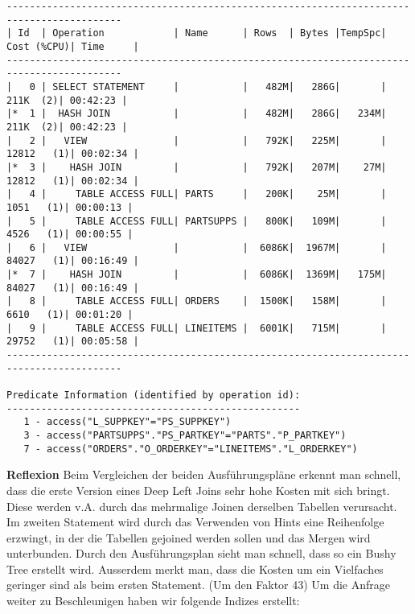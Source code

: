 \documentclass[10pt]{article}
\begin{document}
\begin{lstlisting}[style=queryexecutionplan]
------------------------------------------------------------------------------------------
| Id  | Operation            | Name      | Rows  | Bytes |TempSpc| Cost (%CPU)| Time     |
------------------------------------------------------------------------------------------
|   0 | SELECT STATEMENT     |           |   482M|   286G|       |   211K  (2)| 00:42:23 |
|*  1 |  HASH JOIN           |           |   482M|   286G|   234M|   211K  (2)| 00:42:23 |
|   2 |   VIEW               |           |   792K|   225M|       | 12812   (1)| 00:02:34 |
|*  3 |    HASH JOIN         |           |   792K|   207M|    27M| 12812   (1)| 00:02:34 |
|   4 |     TABLE ACCESS FULL| PARTS     |   200K|    25M|       |  1051   (1)| 00:00:13 |
|   5 |     TABLE ACCESS FULL| PARTSUPPS |   800K|   109M|       |  4526   (1)| 00:00:55 |
|   6 |   VIEW               |           |  6086K|  1967M|       | 84027   (1)| 00:16:49 |
|*  7 |    HASH JOIN         |           |  6086K|  1369M|   175M| 84027   (1)| 00:16:49 |
|   8 |     TABLE ACCESS FULL| ORDERS    |  1500K|   158M|       |  6610   (1)| 00:01:20 |
|   9 |     TABLE ACCESS FULL| LINEITEMS |  6001K|   715M|       | 29752   (1)| 00:05:58 |
------------------------------------------------------------------------------------------

Predicate Information (identified by operation id):
---------------------------------------------------
   1 - access("L_SUPPKEY"="PS_SUPPKEY")
   3 - access("PARTSUPPS"."PS_PARTKEY"="PARTS"."P_PARTKEY")
   7 - access("ORDERS"."O_ORDERKEY"="LINEITEMS"."L_ORDERKEY")
\end{lstlisting}
\textbf{Reflexion} \newline
Beim Vergleichen der beiden Ausführungspläne erkennt man schnell, dass die erste Version eines Deep Left Joins sehr hohe Kosten mit sich bringt. Diese werden v.A. durch das mehrmalige Joinen derselben Tabellen verursacht.\newline
Im zweiten Statement wird durch das Verwenden von Hints eine Reihenfolge erzwingt, in der die Tabellen gejoined werden sollen und das Mergen wird unterbunden.\newline
Durch den Ausführungsplan sieht man schnell, dass so ein Bushy Tree erstellt wird. Ausserdem merkt man, dass die Kosten um ein Vielfaches geringer sind als beim ersten Statement. (Um den Faktor 43)\newline
\newline
Um die Anfrage weiter zu Beschleunigen haben wir folgende Indizes erstellt:
\end{document}
